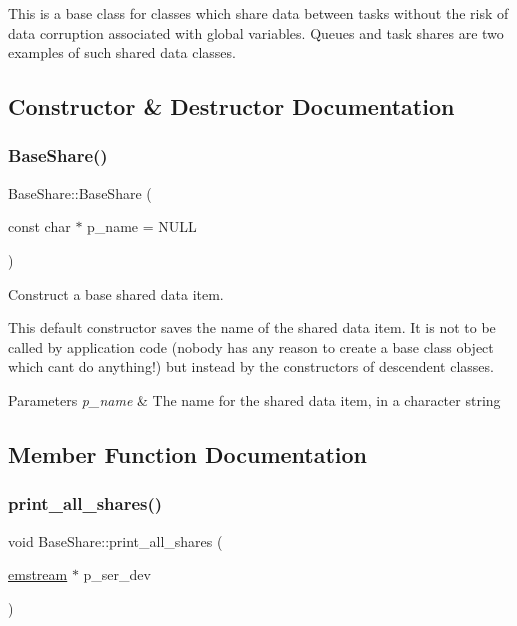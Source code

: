 This is a base class for classes which share data between tasks without the risk of data corruption associated with global variables. Queues and task shares are two examples of such shared data classes. 

\subsection{Constructor \& Destructor Documentation}
\mbox{\label{class_base_share_a9b0cfde3e2ee1869a507e7b8552ccf37}} 
\subsubsection{\texorpdfstring{Base\+Share()}{BaseShare()}}
{\footnotesize\ttfamily Base\+Share\+::\+Base\+Share (\begin{DoxyParamCaption}\item[{const char $\ast$}]{p\+\_\+name = {\ttfamily NULL} }\end{DoxyParamCaption})}



Construct a base shared data item. 

This default constructor saves the name of the shared data item. It is not to be called by application code (nobody has any reason to create a base class object which can\textquotesingle{}t do anything!) but instead by the constructors of descendent classes. 
\begin{DoxyParams}{Parameters}
{\em p\+\_\+name} & The name for the shared data item, in a character string \\
\hline
\end{DoxyParams}


\subsection{Member Function Documentation}
\mbox{\label{class_base_share_a0112f588e48414498d6d2f12db7b347f}} 
\subsubsection{\texorpdfstring{print\+\_\+all\+\_\+shares()}{print\_all\_shares()}}
{\footnotesize\ttfamily void Base\+Share\+::print\+\_\+all\+\_\+shares (\begin{DoxyParamCaption}\item[{\mbox{\hyperlink{classemstream}{emstream}} $\ast$}]{p\+\_\+ser\+\_\+dev }\end{DoxyParamCaption})\hspace{0.3cm}{\ttfamily [inline]}}



